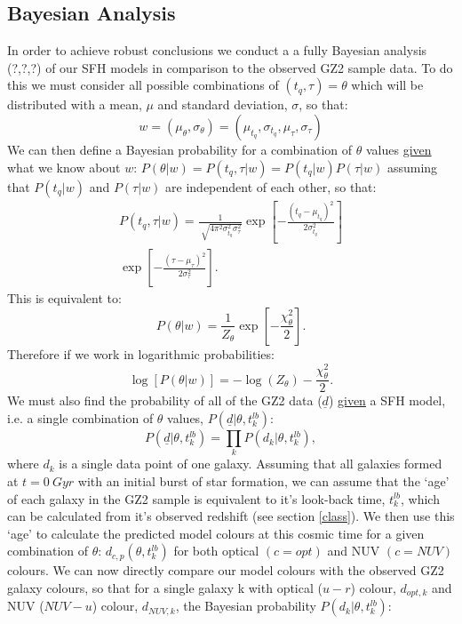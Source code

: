 \documentclass{mn2e}
\begin{document}
\subsection{Bayesian Analysis}\label{stats}
In order to achieve robust conclusions we conduct a a fully Bayesian analysis (?,?,?) of our SFH models in comparison to the observed GZ2 sample data. To do this we must consider all possible combinations of $(t_{q}, \tau) = \theta$ which will be distributed with a mean, $\mu$ and standard deviation, $\sigma$, so that:
\begin{equation*}
w = (\mu_{\theta}, \sigma_{\theta}) = (\mu_{t_{q}}, \sigma_{t_{q}}, \mu_{\tau}, \sigma_{\tau})
\end{equation*}
We can then define a Bayesian probability for a combination of $\theta$ values \underline{given} what we know about $w$: $P(\theta|w) = P(t_{q}, \tau|w) = P(t_{q}|w)P(\tau|w)$ assuming that $ P(t_{q}|w)$ and $P(\tau|w)$ are independent of each other, so that:
\begin{multline*}
P(t_{q}, \tau|w) = \frac{1}{\sqrt[]{4\pi^2\sigma^2_{t_{q}}\sigma^2_{\tau}}} \exp\left[-\frac{(t_{q}-\mu_{t_{q}})^2}{2\sigma^2_{t_{q}}}\right] \\ \exp\left[-\frac{(\tau-\mu_{\tau})^2}{2\sigma^2_{\tau}}\right].
\end{multline*}
This is equivalent to:
\begin{equation*}
P(\theta|w) = \frac{1}{Z_{\theta}} \exp\left[-\frac{\chi_{\theta}^2}{2}\right].
\end{equation*}
Therefore if we work in logarithmic probabilities:
\begin{equation*}
\log[P(\theta|w)] = - \log(Z_{\theta}) - \frac{\chi_{\theta}^2}{2}.
\end{equation*}
We must also find the probability of all of the GZ2 data ($\underline{d}$) \underline{given} a SFH model, i.e. a single combination of $\theta$ values, $P(\underline{d}|\theta, t_{k}^{lb})$:
\begin{equation*}
P(\underline{d}|\theta, t_{k}^{lb}) = \prod_{k} P(d_{k}|\theta, t_{k}^{lb}),
\end{equation*}
where $d_{k}$ is a single data point of one galaxy. Assuming that all galaxies formed at $t=0~Gyr$ with an initial burst of star formation, we can assume that the `age' of each galaxy in the GZ2 sample is equivalent to it's look-back time, $t^{lb}_{k}$, which can be calculated from it's observed redshift (see section \ref{class}). We then use this  `age' to calculate the predicted model colours at this cosmic time for a given combination of $\theta$: $d_{c,p}(\theta, t^{lb}_{k})$ for both optical $(c=opt)$ and NUV $(c=NUV)$ colours. We can now directly compare our model colours with the observed GZ2 galaxy colours, so that for a single galaxy k with optical ($u-r$) colour, $d_{opt, k}$ and NUV ($NUV-u$) colour, $d_{NUV,k}$, the Bayesian probability $P(d_{k}|\theta, t^{lb}_{k})$:
\end{document}

